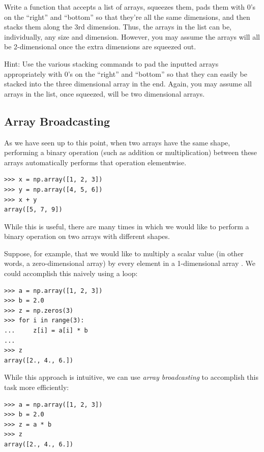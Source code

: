 \begin{problem}
Write a function that accepts a list of arrays, squeezes them, pads them with 0's on the ``right'' and ``bottom'' so that they're all the same dimensions, and then stacks them along the 3rd dimension.
Thus, the arrays in the list can be, individually, any size and dimension. 
However, you may assume the arrays will all be 2-dimensional once the extra dimensions are squeezed out.

Hint: Use the various stacking commands to pad the inputted arrays appropriately with 0's on the ``right'' and ``bottom'' so that they can easily be stacked into the three dimensional array in the end.
Again, you may assume all arrays in the list, once squeezed, will be two dimensional arrays.
\end{problem}

\subsection*{Array Broadcasting} %

As we have seen up to this point, when two arrays have the same shape, performing a binary operation (such as addition or multiplication) between these arrays automatically performs that operation elementwise.

\begin{lstlisting}
>>> x = np.array([1, 2, 3])
>>> y = np.array([4, 5, 6])
>>> x + y
array([5, 7, 9])
\end{lstlisting}

While this is useful, there are many times in which we would like to perform a binary operation on two arrays with different shapes.

Suppose, for example, that we would like to multiply a scalar value  (in other words, a zero-dimensional array) by every element in a 1-dimensional array .
We could accomplish this naively using a loop:

\begin{lstlisting}
>>> a = np.array([1, 2, 3])
>>> b = 2.0
>>> z = np.zeros(3)
>>> for i in range(3):
...     z[i] = a[i] * b
...
>>> z
array([2., 4., 6.])
\end{lstlisting}

While this approach is intuitive, we can use \emph{array broadcasting} to accomplish this task more efficiently:

\begin{lstlisting}
>>> a = np.array([1, 2, 3])
>>> b = 2.0
>>> z = a * b
>>> z
array([2., 4., 6.])
\end{lstlisting}

